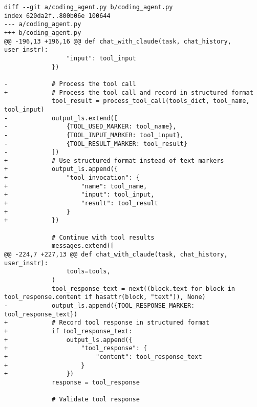 \begin{lstlisting}
diff --git a/coding_agent.py b/coding_agent.py
index 620da2f..800b06e 100644
--- a/coding_agent.py
+++ b/coding_agent.py
@@ -196,13 +196,16 @@ def chat_with_claude(task, chat_history, user_instr):
                 "input": tool_input
             })
 
-            # Process the tool call
+            # Process the tool call and record in structured format
             tool_result = process_tool_call(tools_dict, tool_name, tool_input)
-            output_ls.extend([
-                {TOOL_USED_MARKER: tool_name},
-                {TOOL_INPUT_MARKER: tool_input},
-                {TOOL_RESULT_MARKER: tool_result}
-            ])
+            # Use structured format instead of text markers
+            output_ls.append({
+                "tool_invocation": {
+                    "name": tool_name,
+                    "input": tool_input,
+                    "result": tool_result
+                }
+            })
 
             # Continue with tool results
             messages.extend([
@@ -224,7 +227,13 @@ def chat_with_claude(task, chat_history, user_instr):
                 tools=tools,
             )
             tool_response_text = next((block.text for block in tool_response.content if hasattr(block, "text")), None)
-            output_ls.append({TOOL_RESPONSE_MARKER: tool_response_text})
+            # Record tool response in structured format
+            if tool_response_text:
+                output_ls.append({
+                    "tool_response": {
+                        "content": tool_response_text
+                    }
+                })
             response = tool_response
 
             # Validate tool response
\end{lstlisting}
